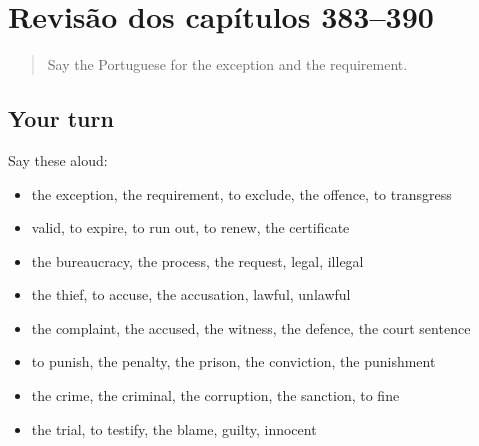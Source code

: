 \section[(dialogue)]{Revisão dos capítulos 383–390}

\label{lesson:PT-R390-revisao-383-390}



\begin{quote}
Say the Portuguese for the exception and the requirement.
\end{quote}

\subsection*{Your turn}
Say these aloud:

\begin{itemize}
\raggedright
  \item the exception, the requirement, to exclude, the offence, to transgress
  \item valid, to expire, to run out, to renew, the certificate
  \item the bureaucracy, the process, the request, legal, illegal
  \item the thief, to accuse, the accusation, lawful, unlawful
  \item the complaint, the accused, the witness, the defence, the court sentence
  \item to punish, the penalty, the prison, the conviction, the punishment
  \item the crime, the criminal, the corruption, the sanction, to fine
  \item the trial, to testify, the blame, guilty, innocent
\end{itemize}


